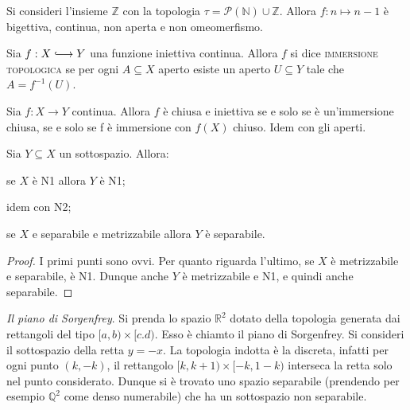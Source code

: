 \documentclass{article}
\begin{document}
\begin{ex}
    Si consideri l'insieme $\mathbb{Z}$ con la topologia $\tau =
    \mathcal{P}(\mathbb{N})\cup\mathbb{Z}$. Allora $f: n \longmapsto n-1$ \`e
    bigettiva, continua, non aperta e non omeomerfismo.
\end{ex}

\begin{defn}
    Sia $f:X \hooklongrightarrow Y$ una funzione iniettiva continua. Allora $f$
    si dice \textsc{immersione topologica} se per ogni $A \subseteq X$ aperto
    esiste un aperto $U \subseteq Y$ tale che $A = f^{-1}(U)$.
\end{defn}

\begin{oss}
    Sia $f: X \longrightarrow Y$ continua. Allora $f$ \`e chiusa e iniettiva se
    e solo se \`e un'immersione chiusa, se e solo se f \`e immersione con $f(X)$
    chiuso. Idem con gli aperti.
\end{oss}

\begin{oss}
    Sia $Y \subseteq X$ un sottospazio. Allora:
    \begin{nlist}
        \item se $X$ \`e N1 allora $Y$ \`e N1;

        \item idem con N2;

        \item se $X$ e separabile e metrizzabile allora $Y$ \`e separabile.
    \end{nlist}
\end{oss}

\begin{proof}
    I primi punti sono ovvi. Per quanto riguarda l'ultimo, se $X$ \`e
    metrizzabile e separabile, \`e N1. Dunque anche $Y$ \`e metrizzabile e N1, e
    quindi anche separabile.
\end{proof}

\begin{ex}
    \emph{Il piano di Sorgenfrey}. Si prenda lo spazio $\mathbb{R}^2$ dotato
    della topologia generata dai rettangoli del tipo ${[a,b) \times [c.d)}$.
    Esso \`e chiamto il piano di Sorgenfrey. Si consideri il sottospazio della
    retta $y=-x$. La topologia indotta \`e la discreta, infatti per ogni punto
    $(k, -k)$, il rettangolo ${[k, k+1)\times[-k, 1-k)}$ interseca la retta solo
    nel punto considerato. Dunque si \`e trovato uno spazio separabile
    (prendendo per esempio $\mathbb{Q}^2$ come denso numerabile) che ha un
    sottospazio non separabile.
\end{ex}
\end{document}
